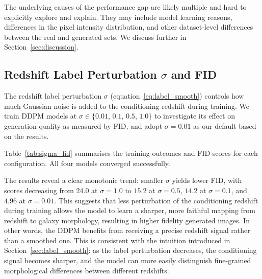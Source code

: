 \documentclass[fleqn,usenatbib]{mnras}
\begin{document}
The underlying causes of the performance gap are likely multiple and hard to explicitly explore and explain. They
may include model learning reasons, differences in the pixel intensity distribution, and other
dataset-level differences between the real and generated sets.
We discuss further in Section~\ref{sec:discussion}.

\subsection{Redshift Label Perturbation $\sigma$ and FID}
\label{sec:sigma_ablation}

The redshift label perturbation $\sigma$ (equation~\ref{eq:label_smooth})
controls how much Gaussian noise is added to the conditioning redshift
during training.
We train DDPM models at $\sigma \in \{0.01,\, 0.1,\, 0.5,\, 1.0\}$
to investigate its effect on generation quality as measured by FID,
and adopt $\sigma = 0.01$ as our default based on the results.

Table~\ref{tab:sigma_fid} summarises the training outcomes and FID
scores for each configuration.
All four models converged successfully.

The results reveal a clear monotonic trend: smaller $\sigma$ yields
lower FID, with scores decreasing from $24.0$ at $\sigma = 1.0$ to
$15.2$ at $\sigma = 0.5$, $14.2$ at $\sigma = 0.1$, and $4.96$ at
$\sigma = 0.01$.
This suggests that less perturbation of the conditioning redshift
during training allows the model to learn a sharper, more faithful
mapping from redshift to galaxy morphology, resulting in higher
fidelity generated images.
In other words, the DDPM benefits from receiving a precise redshift
signal rather than a smoothed one. This is consistent with the
intuition introduced in Section~\ref{sec:label_smooth}: as the label
perturbation decreases, the conditioning signal becomes sharper, and
the model can more easily distinguish fine-grained morphological
differences between different redshifts.
\end{document}
